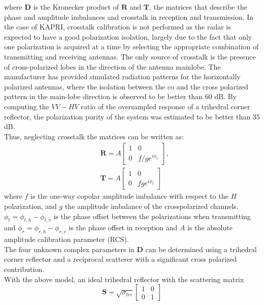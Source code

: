 where $\mathbf{D}$ is the Kronecker product of $\mathbf{R}$ and $\mathbf{T}$, the matrices that describe the phase and amplitude imbalances and crosstalk in reception and transmission.
In the case of KAPRI, crosstalk calibration is not performed as the radar is expected to have a good polarization isolation, largely due to the fact that only one polarization is acquired at a time by selecting the appropriate combination of transmitting and receiving antennas. The only source of crosstalk is the presence of cross-polarized lobes in the direction of the antenna mainlobe. The manufacturer has provided simulated radiation patterns for the horizontally polarized antennas, where the isolation between the co and the cross polarized pattern in the main-lobe direction is observed to be better than 60 dB. By computing the $VV-HV$ ratio of the oversampled response of a trihedral corner reflector, the polarization purity of the system was estimated to be better than 35 dB.\\
Thus, neglecting crosstalk the matrices can be written as:
\begin{equation}
	\begin{aligned}
	&\mathbf{R} = A \begin{bmatrix}
		1 & 0\\
		0 & f/g e^{i\phi_{r}}
	\end{bmatrix},\\
	&\mathbf{T} = A \begin{bmatrix}
			1 & 0\\
			0 & f g e^{i\phi_{t}}
		\end{bmatrix}
	\end{aligned}
\end{equation}
where $f$ is the one-way copolar amplitude imbalance with respect to the $H$ polarization, and $g$ the amplitude imbalance of the crosspolarized channels. $\phi_t = \phi_{t,h} -\phi_{t,v}$ is the phase offset between the polarizations when transmitting and $\phi_{r} = \phi_{r,h} -\phi_{r,v}$ is the phase offset in reception and $A$ is the absolute amplitude calibration parameter (RCS)\cite{Ainsworth2006a, Fore2015}.\\
The four unknown complex parameters in $\mathbf{D}$ can be determined using a trihedral corner reflector and a reciprocal scatterer with a significant cross polarized contribution\cite{Sarabandi1989,Pipia2009}.\\
With the above model, an ideal trihedral reflector with the scattering matrix
\begin{equation}
 \mathbf{S} = \sqrt{\sigma_{tri}}
 \begin{bmatrix}1 & 0\\ 0 & 1\end{bmatrix}
\end{equation}

